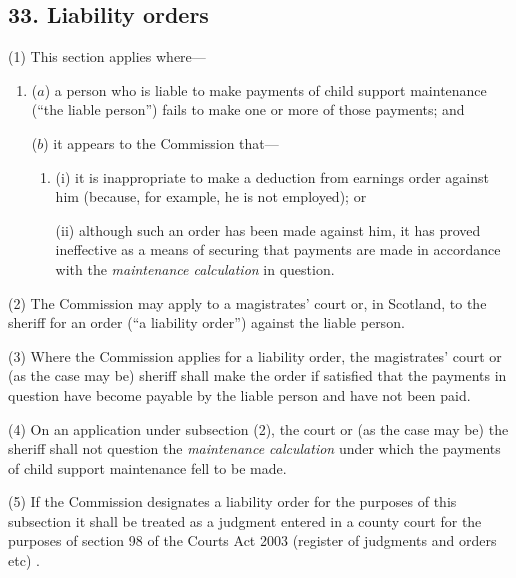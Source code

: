 \documentclass[12pt,a4paper]{article}
\begin{document}
\subsection{33. Liability orders}

(1) This section applies where—
\begin{enumerate}\item[]
($a$) a person who is liable to make payments of child support maintenance (“the liable person”) fails to make one or more of those payments; and

($b$) it appears to the 
Commission  %
that—
\begin{enumerate}\item[]
(i) it is inappropriate to make a deduction from earnings order against him (because, for example, he is not employed); or

(ii) although such an order has been made against him, it has proved ineffective as a means of securing that payments are made in accordance with the 
\emph{maintenance calculation}  %
in question.
\end{enumerate}
\end{enumerate}

(2) The 
Commission  %
may apply to a magistrates' court or, in Scotland, to the sheriff for an order (“a liability order”) against the liable person.

(3) Where the 
Commission  %
applies for a liability order, the magistrates' court or (as the case may be) sheriff shall make the order if satisfied that the payments in question have become payable by the liable person and have not been paid.

(4) On an application under subsection (2), the court or (as the case may be) the sheriff shall not question the 
\emph{maintenance calculation}  %
under which the payments of child support maintenance fell to be made.

(5) If the 
Commission  %
designates a liability order for the purposes of this subsection it shall be treated as a judgment entered in a county court for the purposes of %
section 98 of the Courts Act 2003 (register of judgments and orders etc)%
.
\end{document}

